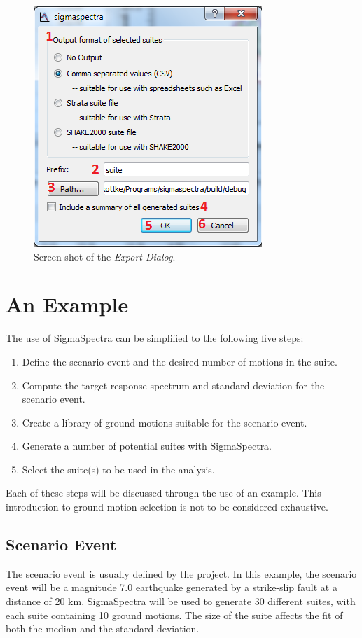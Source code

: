 \documentclass[11pt]{article}
\begin{document}
\begin{figure}[tbp]
  \begin{center}
	\includegraphics[scale=0.7]{screenshots/export}
  \end{center}
  \caption{Screen shot of the \emph{Export Dialog}.}
  \label{fig:interface:export}
\end{figure}

\section{An Example}
The use of SigmaSpectra can be simplified to the following five steps:
\begin{enumerate}
\item Define the scenario event and the desired number of motions in the suite.
\item Compute the target response spectrum and standard deviation for the scenario event.
\item Create a library of ground motions suitable for the scenario event.
\item Generate a number of potential suites with SigmaSpectra.
\item Select the suite(s) to be used in the analysis.
\end{enumerate}
Each of these steps will be discussed through the use of an example. This
introduction to ground motion selection is not to be considered exhaustive.

\subsection{Scenario Event}
The scenario event is usually defined by the project. In this example, the scenario event will be a
magnitude 7.0 earthquake generated by a strike-slip fault at a distance of 20 km. SigmaSpectra will
be used to generate 30 different suites, with each suite containing 10 ground motions. The size of
the suite affects the fit of both the median and the standard deviation.
\end{document}
